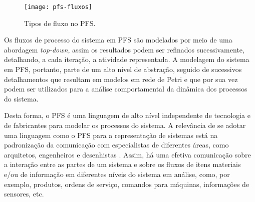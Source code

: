 \begin{figure}[htb]
	\centering
	\texttt{[image: pfs-fluxos]}
	\caption{Tipos de fluxo no PFS.}
	\label{fig:pfs-fluxos}
\end{figure}

Os fluxos de processo do sistema em PFS são modelados por meio de uma abordagem \textit{top-down}, assim os resultados podem ser refinados sucessivamente, detalhando, a cada iteração, a atividade representada. A modelagem do sistema em PFS, portanto, parte de um alto nível de abstração, seguido de sucessivos detalhamentos que resultam em modelos em rede de Petri e que por sua vez podem ser utilizados para a análise comportamental da dinâmica dos processos do sistema.

Desta forma, o PFS é uma linguagem de alto nível independente de tecnologia e de fabricantes para modelar os processos do sistema. A relevância de se adotar uma linguagem como o PFS para a representação de sistemas está na padronização da comunicação com especialistas de diferentes áreas, como arquitetos, engenheiros e desenhistas \cite{pisching2018pfs}. Assim, há uma efetiva comunicação sobre a interação entre as partes de um sistema e sobre os fluxos de itens materiais e/ou de informação em diferentes níveis do sistema em análise, como, por exemplo, produtos, ordens de serviço, comandos para máquinas, informações de sensores, etc.
